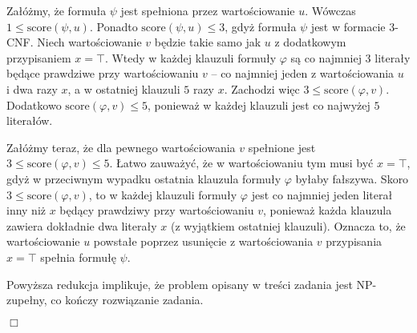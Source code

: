 \documentclass[12pt]{article}
\begin{document}
	\medskip
	
	Załóżmy, że formuła \(\psi\) jest spełniona przez wartościowanie \(u\).
	Wówczas \(1 \leqslant \text{score} \left( \psi, u \right)\). Ponadto
	\(\text{score} \left( \psi, u \right) \leqslant 3\), gdyż formuła \(\psi\)
	jest w formacie 3-CNF. Niech wartościowanie \(v\) będzie takie samo jak
	\(u\) z dodatkowym przypisaniem \(x = \top\). Wtedy w każdej klauzuli
	formuły \(\varphi\) są co najmniej \(3\) literały będące prawdziwe przy
	wartościowaniu \(v\) -- co najmniej jeden z wartościowania \(u\) i dwa razy
	\(x\), a w ostatniej klauzuli \(5\) razy \(x\). Zachodzi więc \(3 \leqslant
	\text{score} \left( \varphi, v \right)\). Dodatkowo \(\text{score} \left(
	\varphi, v \right) \leqslant 5\), ponieważ w każdej klauzuli jest co
	najwyżej \(5\) literałów.
	
	\medskip
	
	Załóżmy teraz, że dla pewnego wartościowania \(v\) spełnione jest \(3
	\leqslant \text{score} \left( \varphi, v \right) \leqslant 5\). Łatwo
	zauważyć, że w wartościowaniu tym musi być \(x = \top\), gdyż w przeciwnym
	wypadku ostatnia klauzula formuły \(\varphi\) byłaby fałszywa. Skoro \(3
	\leqslant \text{score} \left( \varphi, v \right)\), to w każdej klauzuli
	formuły \(\varphi\) jest co najmniej jeden literał inny niż \(x\) będący
	prawdziwy przy wartościowaniu \(v\), ponieważ każda klauzula zawiera
	dokładnie dwa literały \(x\) (z wyjątkiem ostatniej klauzuli). Oznacza to,
	że wartościowanie \(u\) powstałe poprzez usunięcie z wartościowania \(v\)
	przypisania \(x = \top\) spełnia formułę \(\psi\).
	
	\medskip
	
	Powyższa redukcja implikuje, że problem opisany w treści zadania jest
	NP-zupełny, co kończy rozwiązanie zadania.
	\begin{flushright}
		\(\Box\)
	\end{flushright}
\end{document}
